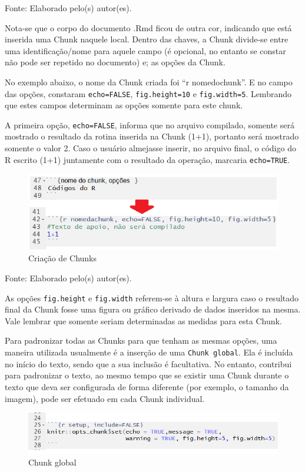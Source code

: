 \documentclass[12pt,brazil,]{book}
\begin{document}
Fonte: Elaborado pelo(s) autor(es).

Nota-se que o corpo do documento .Rmd ficou de outra cor, indicando que
está inserida uma Chunk naquele local. Dentro das chaves, a Chunk
divide-se entre uma identificação/nome para aquele campo (é opcional, no
entanto se constar não pode ser repetido no documento) e; as opções da
Chunk.

No exemplo abaixo, o nome da Chunk criada foi ``r nomedochunk''. E no
campo das opções, constaram \texttt{echo=FALSE}, \texttt{fig.height=10}
e \texttt{fig.width=5}. Lembrando que estes campos determinam as opções
somente para este chunk.

A primeira opção, \texttt{echo=FALSE}, informa que no arquivo compilado,
somente será mostrado o resultado da rotina inserida na Chunk (1+1),
portanto será mostrado somente o valor 2. Caso o usuário almejasse
inserir, no arquivo final, o código do R escrito (1+1) juntamente com o
resultado da operação, marcaria \texttt{echo=TRUE}.

\begin{figure}

{\centering \includegraphics[width=0.6\linewidth]{rmarkchunk2} 

}

\caption{Criação de Chunks}\label{fig:rmarkchunk2}
\end{figure}

Fonte: Elaborado pelo(s) autor(es).

As opções \texttt{fig.height} e \texttt{fig.width} referem-se à altura e
largura caso o resultado final da Chunk fosse uma figura ou gráfico
derivado de dados inseridos na mesma. Vale lembrar que somente seriam
determinadas as medidas para esta Chunk.

Para padronizar todas as Chunks para que tenham as mesmas opções, uma
maneira utilizada usualmente é a inserção de uma \texttt{Chunk\ global}.
Ela é incluída no início do texto, sendo que a sua inclusão é
facultativa. No entanto, contribui para padronizar o texto, ao mesmo
tempo que se existir uma Chunk durante o texto que deva ser configurada
de forma diferente (por exemplo, o tamanho da imagem), pode ser efetuado
em cada Chunk individual.

\begin{figure}

{\centering \includegraphics[width=0.6\linewidth]{rmarkchunkopt} 

}

\caption{Chunk global}\label{fig:rmarkchunkopt}
\end{figure}
\end{document}
